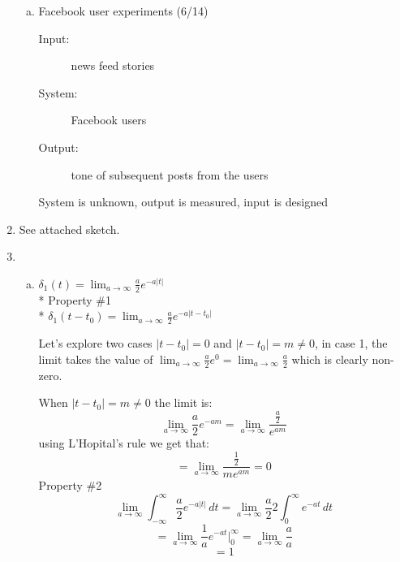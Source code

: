 \documentclass[10pt, letterpaper]{article}
\begin{document}
\begin{enumerate}[1)]
\begin{enumerate}[a.]
    \item Facebook user experiments (6/14)
        \begin{description}
            \item[Input:] news feed stories
            \item[System:] Facebook users
            \item[Output:] tone of subsequent posts from the users
        \end{description}

        System is unknown, output is measured, input is designed
    \end{enumerate}


\item
    See attached sketch.


\item
    \begin{enumerate}[a.]
    \item
        $\delta_1(t) = \lim_{a \to \infty} \frac{a}{2} e^{-a|t|}$\\*
        Property \#1 \\*
        $\delta_1(t - t_0) = \lim_{a \to \infty} \frac{a}{2} e^{-a|t - t_0|}$

        Let's explore two cases $|t - t_0| = 0$ and $|t - t_0| = m \neq 0$, in case 1, 
        the limit takes the value of $\lim_{a \to \infty} \frac{a}{2} e^{0} = \lim_{a \to \infty} \frac{a}{2}$ 
        which is clearly non-zero.

        When $|t - t_0| = m \neq 0$ the limit is:
        \[
        \lim_{a \to \infty} \frac{a}{2} e^{-am} = 
        \lim_{a \to \infty} \frac{\frac{a}{2} }{e^{am}}
        \]
        using L'Hopital's rule we get that:
        \[ =
        \lim_{a \to \infty} \frac{\frac{1}{2} }{me^{am}} = 0
        \]
        Property \#2
        \[
        \lim_{a \to \infty} \int_{-\infty}^{\infty}\frac{a}{2} e^{-a|t|}\,dt = 
        \lim_{a \to \infty} \frac{a}{2} 2 \int_{0}^{\infty} e^{-at}\,dt 
        \]
        \[
        = \lim_{a \to \infty} \frac{1}{a} e^{-at} |_{0}^{\infty}
        = \lim_{a \to \infty} \frac{a}{a}
        \]
        \[= 1\]


\end{enumerate}
\end{enumerate}
\end{document}

